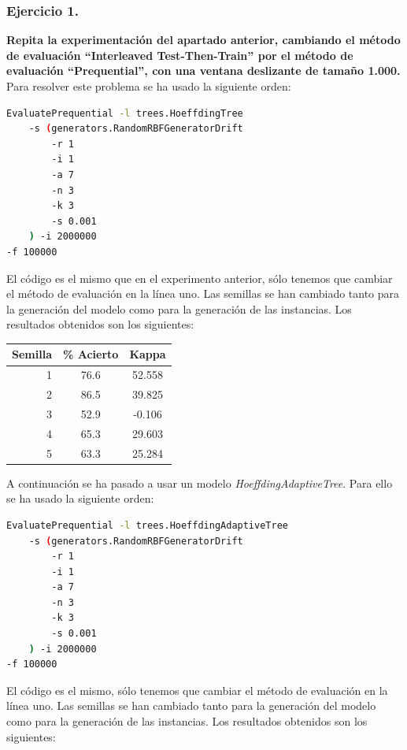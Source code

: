 \documentclass[11pt]{article}
\begin{document}
\subsubsection{Ejercicio 1.}

\textbf{Repita la experimentación del apartado anterior, cambiando el método de evaluación ``Interleaved Test-Then-Train'' por el método de evaluación ``Prequential'', con una ventana deslizante de tamaño 1.000.} \\

Para resolver este problema se ha usado la siguiente orden:

\begin{lstlisting}[language=bash]
EvaluatePrequential -l trees.HoeffdingTree
	-s (generators.RandomRBFGeneratorDrift 
		-r 1 
		-i 1 
		-a 7 
		-n 3
		-k 3 
		-s 0.001 
	) -i 2000000
-f 100000
\end{lstlisting}

El código es el mismo que en el experimento anterior, sólo tenemos que cambiar el método de evaluación en la línea uno. Las semillas se han cambiado tanto para la generación del modelo como para la generación de las instancias. Los resultados obtenidos son los siguientes:

\begin{table}[H]
	\centering
	\begin{tabular}{rcc}
		\textbf{Semilla} & \textbf{\% Acierto} & \textbf{Kappa} \\ \hline
		1 & 76.6 & 52.558 \\
		2 & 86.5 & 39.825 \\
		3 & 52.9 & -0.106 \\
		4 & 65.3 & 29.603 \\
		5 & 63.3 & 25.284
	\end{tabular}
\end{table}

A continuación se ha pasado a usar un modelo \textit{HoeffdingAdaptiveTree}. Para ello se ha usado la siguiente orden:

\begin{lstlisting}[language=bash]
EvaluatePrequential -l trees.HoeffdingAdaptiveTree
	-s (generators.RandomRBFGeneratorDrift 
		-r 1 
		-i 1 
		-a 7 
		-n 3
		-k 3 
		-s 0.001 
	) -i 2000000
-f 100000
\end{lstlisting}

El código es el mismo, sólo tenemos que cambiar el método de evaluación en la línea uno. Las semillas se han cambiado tanto para la generación del modelo como para la generación de las instancias. Los resultados obtenidos son los siguientes:
\end{document}
